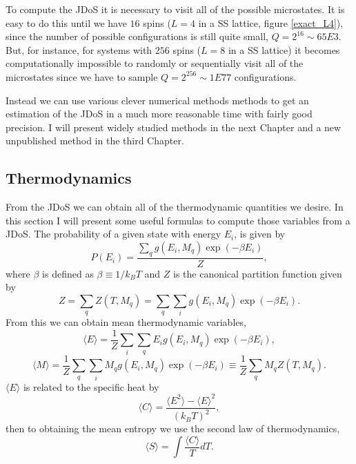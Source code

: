 To compute the JDoS it is necessary to visit all of the possible microstates. It is easy to do this until we have $16$ spins ($L=4$ in a SS lattice, figure \ref{exact_L4}), since the number of possible configurations is still quite small, $Q = 2^{16}\sim 65E3$. But, for instance, for systems with $256$ spins ($L=8$ in a SS lattice) it becomes computationally impossible to randomly or sequentially visit all of the microstates since we have to sample $Q = 2^{256} \sim 1E77$ configurations. 

Instead we can use various clever numerical methods methods to get an estimation of the JDoS in a much more reasonable time with fairly good precision. I will present widely studied methods in the next Chapter and a new unpublished method in the third Chapter.

\subsection{Thermodynamics}

From the JDoS we can obtain all of the thermodynamic quantities we desire. In this section I will present some useful formulas to compute those variables from a JDoS. 
The probability of a given state with energy $E_i$, is given by
\begin{equation}
	P(E_i) = \frac{\sum_q g(E_i, M_q) \exp(-\beta E_i)}{Z},
\end{equation}
where $\beta$ is defined as $\beta \equiv 1/k_BT$ and $Z$ is the canonical partition function given by
\begin{equation}
	Z = \sum_q Z(T, M_q) = \sum_q \sum_i g(E_i, M_q) \exp(-\beta E_i).
\end{equation}
From this we can obtain mean thermodynamic variables, 
\begin{equation}
	\langle E \rangle = \frac{1}{Z} \sum_i \sum_q E_i g(E_i, M_q) \exp(-\beta E_i),
\end{equation}
\begin{equation}
	\langle M \rangle  = \frac{1}{Z} \sum_q \sum_i M_q g(E_i, M_q) \exp(-\beta E_i) \equiv \frac{1}{Z} \sum_q M_q Z(T, M_q).
\end{equation}
$\langle E \rangle$ is related to the specific heat by 
\begin{equation}
	\langle C \rangle = \frac{\langle E^2 \rangle - \langle E \rangle^2}{\left( k_BT \right)^2},
\end{equation}
then to obtaining the mean entropy we use the second law of thermodynamics,
\begin{equation}
	\langle S \rangle= \int \frac{\langle C \rangle}{T} dT.
\end{equation}

